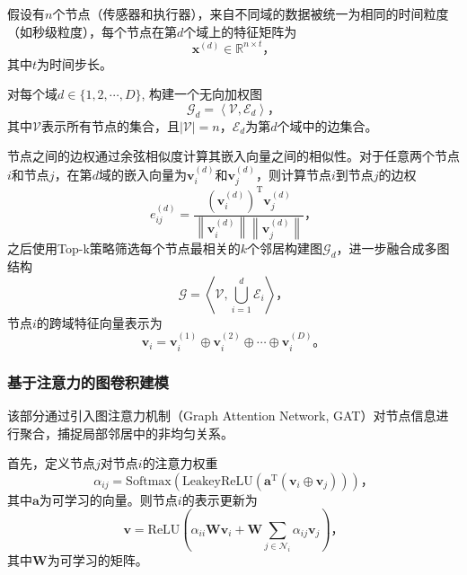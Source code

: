 假设有$n$个节点（传感器和执行器），来自不同域的数据被统一为相同的时间粒度（如秒级粒度），每个节点在第$d$个域上的特征矩阵为
\begin{equation*}
    \bm{x}^{(d)}\in\mathbb{R}^{n\times t} \text{，}
\end{equation*}
其中$t$为时间步长。

对每个域$d\in\{1,2,\cdots,D\}$, 构建一个无向加权图
\begin{equation*}
    \mathcal{G}_d=\left<\mathcal{V},\mathcal{E}_d\right> \text{，}
\end{equation*}
其中$\mathcal{V}$表示所有节点的集合，且$|\mathcal{V}|=n$，$\mathcal{E}_d$为第$d$个域中的边集合。

节点之间的边权通过余弦相似度计算其嵌入向量之间的相似性。对于任意两个节点$i$和节点$j$，在第$d$域的嵌入向量为$\bm{v}_i^{(d)}$和$\bm{v}_j^{(d)}$，则计算节点$i$到节点$j$的边权
\begin{equation*}
    e_{ij}^{(d)}=\frac{\left(\bm{v}_i^{(d)}\right)^\mathrm{T}\bm{v}_j^{(d)}}{\left\|\bm{v}_i^{(d)}\right\|\left\|\bm{v}_j^{(d)}\right\|} \text{，}
\end{equation*}
之后使用Top-k策略筛选每个节点最相关的$k$个邻居构建图$\mathcal{G}_d$，进一步融合成多图结构
\begin{equation*}
    \mathcal{G}=\left<\mathcal{V}, \textstyle\bigcup_{i=1}^d\mathcal{E}_i\right> \text{，}
\end{equation*}
节点$i$的跨域特征向量表示为
\begin{equation*}
    \bm{v}_i=\bm{v}_i^{(1)}\oplus\bm{v}_i^{(2)}\oplus\cdots\oplus\bm{v}_i^{(D)} \text{。}
\end{equation*}

\subsubsection{基于注意力的图卷积建模}

该部分通过引入图注意力机制（Graph Attention Network, GAT）\cite{deng2021graph}对节点信息进行聚合，捕捉局部邻居中的非均匀关系。

首先，定义节点$j$对节点$i$的注意力权重
\begin{equation*}
    \alpha_{ij}=\mathrm{Softmax}\left(\mathrm{LeakeyReLU}\left(\bm{a}^\mathrm{T}(\bm{v}_i\oplus\bm{v}_j)\right)\right) \text{，}
\end{equation*}
其中$\bm{a}$为可学习的向量。则节点$i$的表示更新为
\begin{equation*}
    \bm{v}=\mathrm{ReLU}\left(\alpha_{ii}\bm{W}\bm{v}_i+\bm{W}\sum_{j\in\mathcal{N}_i}\alpha_{ij}\bm{v}_j\right) \text{，}
\end{equation*}
其中$\bm{W}$为可学习的矩阵。

